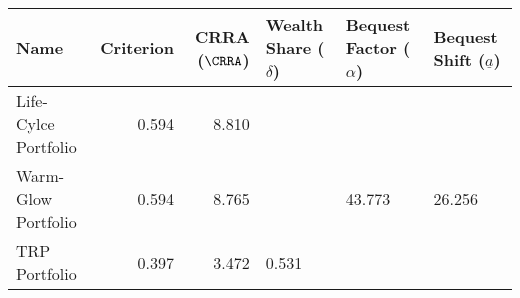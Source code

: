 \begin{tabular}{lrrlll}
    \toprule
    Name                 & Criterion & CRRA ($\CRRA$) & Wealth Share ($\delta$) & Bequest Factor ($\alpha$) & Bequest Shift ($\underline{a}$) \\
    \midrule
    Life-Cylce Portfolio & 0.594     & 8.810          &                         &                           &                                 \\
    Warm-Glow Portfolio  & 0.594     & 8.765          &                         & 43.773                    & 26.256                          \\
    TRP Portfolio        & 0.397     & 3.472          & 0.531                   &                           &                                 \\
    \bottomrule
\end{tabular}
